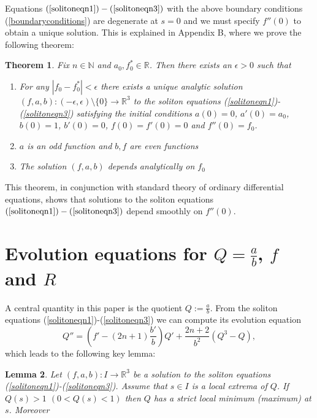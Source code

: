 \documentclass{amsart}
\newtheorem{thm}{Theorem}[section]
\newtheorem{lem}[thm]{Lemma}
\theoremstyle{definition}
\theoremstyle{remark}
\numberwithin{equation}{section}
\newcommand{\R}{\mathbb{R}}  %
\newcommand{\N}{\mathbb{N}}
\begin{document}
Equations $(\ref{solitoneqn1})-(\ref{solitoneqn3})$ with the above boundary conditions (\ref{boundaryconditions}) are degenerate at $s=0$ and we must specify $f''(0)$ to obtain a unique solution. This is explained in Appendix B, where we prove the following theorem:

\begin{thm}
\label{analiticity}
Fix $n \in \N$ and $a_0, f_0^{\ast} \in \R$. Then there exists an $\epsilon > 0$ such that
\begin{enumerate}
\item For any $|f_0-f_0^{\ast}|<\epsilon$ there exists a unique analytic solution $(f,a,b): (-\epsilon, \epsilon) \setminus \{0\}\rightarrow \R^3$ to the soliton equations (\ref{solitoneqn1})-(\ref{solitoneqn3}) satisfying the initial conditions $a(0) = 0$, $a'(0) = a_0$, $b(0) = 1$, $b'(0) = 0$, $f(0) = f'(0) = 0$ and $f''(0) = f_0$.
\item $a$ is an odd function and $b,f$ are even functions
\item The solution $(f,a,b)$ depends analytically on $f_0$
\end{enumerate}
\end{thm}

This theorem, in conjunction with standard theory of ordinary differential equations, shows that solutions to the soliton equations $(\ref{solitoneqn1})-(\ref{solitoneqn3})$ depend smoothly on $f''(0)$.

\section{Evolution equations for $Q= \frac{a}{b}$, $f$ and $R$}
\label{Qevol}
A central quantity in this paper is the quotient $Q:= \frac{a}{b}$. From the soliton equations (\ref{solitoneqn1})-(\ref{solitoneqn3}) we can compute its evolution equation
\begin{equation}
\label{Qeqn}
Q'' = \left( f' - (2n+1) \frac{b'}{b}\right) Q' + \frac{2n+2}{b^2}\left(Q^3- Q \right),
\end{equation}
which leads to the following key lemma:
\begin{lem}
\label{QkeyLemma}
Let $(f,a,b): I \rightarrow \R^3$ be a solution to the soliton equations (\ref{solitoneqn1})-(\ref{solitoneqn3}). Assume that $s \in I$ is a local extrema of $Q$. If $Q(s) > 1$ $(0 < Q(s) < 1)$ then $Q$ has a strict local minimum (maximum) at $s$. Moreover
\end{lem}
\end{document}
